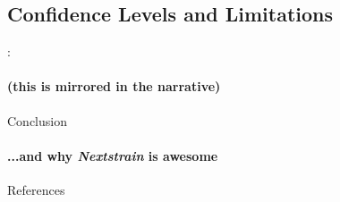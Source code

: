 \documentclass{beamer}
\begin{document}
\begin{darkframes}
    \subsection{Confidence Levels and Limitations}
    \begin{frame}{\secname : \subsecname}
      \framesubtitle{(this is mirrored in the narrative)}
    \end{frame}

    \begin{frame}{Conclusion}
      \framesubtitle{...and why \textit{Nextstrain} is awesome}
    \end{frame}

    \begin{frame}{References}


    \end{frame}




  \end{darkframes}
\end{document}
